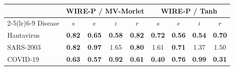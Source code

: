 \begin{tabular}{lcccccccc}
\toprule
 & \multicolumn{4}{c}{WIRE-P / MV-Morlet} & \multicolumn{4}{c}{WIRE-P / Tanh} \\
\cmidrule(lr){2-5}\cmidrule(lr){6-9}
Disease & $s$ & $e$ & $i$ & $r$ & $s$ & $e$ & $i$ & $r$ \\
\midrule
Hantavirus & \textbf{0.82} & \textbf{0.65} & \textbf{0.58} & \textbf{0.82} & \textbf{0.72} & \textbf{0.56} & \textbf{0.54} & \textbf{0.70} \\
SARS-2003 & \textbf{0.82} & \textbf{0.97} & 1.65 & \textbf{0.80} & 1.61 & \textbf{0.71} & 1.37 & 1.50 \\
COVID-19 & \textbf{0.63} & \textbf{0.57} & \textbf{0.92} & \textbf{0.61} & \textbf{0.40} & \textbf{0.76} & \textbf{0.99} & \textbf{0.31} \\
\bottomrule
\end{tabular}